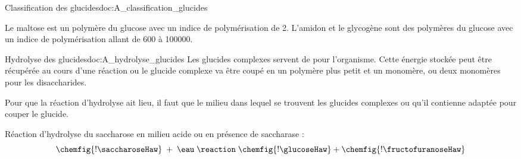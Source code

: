 \begin{doc}{Classification des glucides}{doc:A_classification_glucides}
\begin{center}
  \end{center}

  Le maltose est un polymère du glucose avec un indice de polymérisation de \num{2}.
  L'amidon et le glycogène sont des polymères du glucose avec un indice de polymérisation allant de \num{600} à \num{100000}.
\end{doc}

\begin{doc}{Hydrolyse des glucides}{doc:A_hydrolyse_glucides}
  Les glucides complexes servent de  pour l'organisme. 
  Cette énergie stockée peut être récupérée au cours d'une réaction  ou le glucide complexe va être coupé en un polymère plus petit et un monomère, ou deux monomères pour les disaccharides.

  \begin{importants}
    Pour que la réaction d'hydrolyse ait lieu, il faut que le milieu dans lequel se trouvent les glucides complexes  ou qu'il contienne  adaptée pour couper le glucide.
  \end{importants}

  \exemple Réaction d'hydrolyse du saccharose en milieu acide ou en présence de saccharase :
  \begin{equation*}
    \chemfig{!\saccharoseHaw} \; + \; \eau 
    \; \reaction \; 
    \chemfig{!\glucoseHaw} + \chemfig{!\fructofuranoseHaw}
  \end{equation*}
\end{doc}

